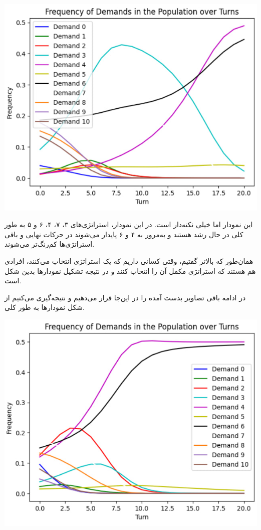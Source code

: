 \begin{center}
	\includegraphics{8}
\end{center}

این نمودار اما خیلی نکته‌دار است. در این نمودار، استراتژی‌های ۳، ۷، ۴، ۶ و ۵ به طور کلی در حال رشد هستند و به‌مرور به ۴ و ۶ پایدار می‌شوند در حرکات نهایی و باقی استراتژی‌ها کم‌رنگ‌تر می‌شوند.

همان‌طور که بالاتر گفتیم،
وقتی کسانی داریم که یک استراتژی انتخاب می‌کنند، افرادی هم هستند که استراتژی مکمل آن را انتخاب کنند و در نتیجه تشکیل نمودارها بدین شکل است.

در ادامه باقی تصاویر بدست آمده را در این‌جا قرار می‌دهیم و نتیجه‌گیری می‌کنیم از شکل نمودارها به طور کلی.

\begin{center}
	\includegraphics{9}
\end{center}

